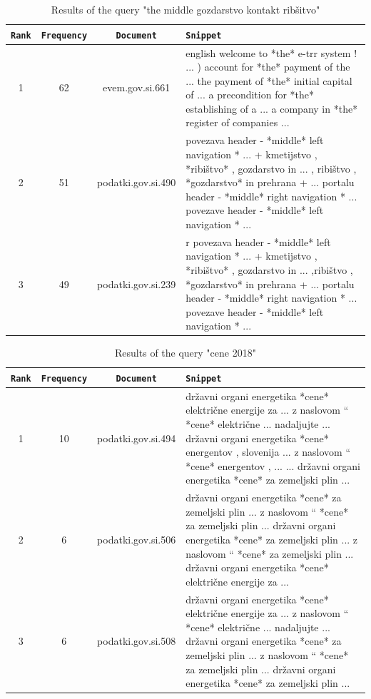 \documentclass{article}
\begin{document}
	\begin{table}[!hbt]
		\centering
		\begin{tabularx}{\textwidth}{c|c|c|X}
			\texttt{Rank} & \texttt{Frequency} & \texttt{Document} & \texttt{Snippet}  \\ \hline
			1& 62 & evem.gov.si.661 & english welcome to *the* e-trr system ! ... ) account for *the* payment of the ... the payment of *the* initial capital of ... a precondition for *the* establishing of a ... a company in *the* register of companies ...  \\ \hline
			2& 51 & podatki.gov.si.490 & povezava header - *middle* left navigation * ... + kmetijstvo , *ribištvo* , gozdarstvo in ... , ribištvo , *gozdarstvo* in prehrana + ... portalu header - *middle* right navigation * ... povezave header - *middle* left navigation * ...  \\ \hline
			3 & 49 & podatki.gov.si.239 & r povezava header - *middle* left navigation * ... + kmetijstvo , *ribištvo* , gozdarstvo in ... ,ribištvo , *gozdarstvo* in prehrana + ... portalu header - *middle* right navigation * ... povezave  header - *middle* left navigation * ...
		\end{tabularx}
		\caption{Results of the query "the middle gozdarstvo kontakt ribšitvo"}
		\label{tab:3}
	\end{table}
	
	\begin{table}[!hbt]
		\centering
		\begin{tabularx}{\textwidth}{c|c|c|X}
			\texttt{Rank} & \texttt{Frequency} & \texttt{Document} & \texttt{Snippet}  \\ \hline
			1& 10 & podatki.gov.si.494&  državni organi energetika *cene* električne energije za ... z naslovom `` *cene* električne ... nadaljujte ... državni organi energetika *cene* energentov , slovenija ... z naslovom `` *cene* energentov , ... ... državni organi energetika *cene* za zemeljski plin ... \\ \hline
			2& 6 & podatki.gov.si.506 & državni organi energetika *cene* za zemeljski plin ... z naslovom `` *cene* za zemeljski plin ... državni organi energetika *cene* za zemeljski plin ... z naslovom `` *cene* za zemeljski plin ... državni organi energetika *cene* električne energije za ... \\ \hline
			3 & 6 & podatki.gov.si.508 & državni organi energetika *cene* električne energije za ... z naslovom `` *cene* električne ... nadaljujte ... državni organi energetika *cene* za zemeljski plin ... z naslovom `` *cene* za zemeljski plin ... državni organi energetika *cene* za zemeljski plin ...
		\end{tabularx}
		\caption{Results of the query "cene 2018"}
		\label{tab:4}
	\end{table}
\end{document}
